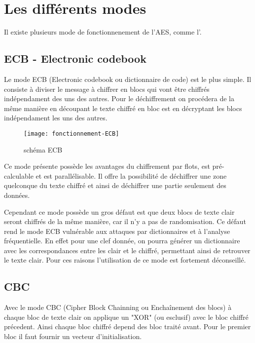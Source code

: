 \chapter{Les différents modes}
\label{chap:différents modes}

Il existe plusieurs mode de fonctionnenement de l'AES, comme l'\aes.

\section{ECB - Electronic codebook}

Le mode ECB (Electronic codebook ou dictionnaire de code) est le plus simple. Il consiste à diviser le message à chiffrer en blocs qui vont être chiffrés indépendament des uns des autres. Pour le déchiffrement on procédera de la même manière en découpant le texte chiffré en bloc est en décryptant les blocs indépendament les uns des autres.

\begin{figure}[!h]
  \centering
  \texttt{[image: fonctionnement-ECB]}
  \caption{schéma ECB \cite{wiki}}
  \label{schema ECB}
\end{figure}

Ce mode présente possède les avantages du chiffrement par flots, est pré-calculable et est parallélisable. Il offre la possibilité de déchiffrer une zone quelconque du texte chiffré et ainsi de déchiffrer une partie seulement des données.

Cependant ce mode possède un gros défaut est que deux blocs de texte clair seront chiffrés de la même manière, car il n'y a pas de randomisation. Ce défaut rend le mode ECB vulnérable aux attaques par dictionnaires et à l'analyse fréquentielle. En effet pour une clef donnée, on pourra générer un dictionnaire avec les correspondances entre les clair et le chiffré, permettant ainsi de retrouver le texte clair. Pour ces raisons l'utilisation de ce mode est fortement déconseillé.

\section{CBC}

Avec le mode CBC (Cipher Block Chainning ou Enchaînement des blocs) à chaque bloc de texte clair on applique un "XOR" (ou esclusif) avec le bloc chiffré précedent. Ainsi chaque bloc chiffré depend des bloc traité avant. Pour le premier bloc il faut fournir un vecteur d'initialisation.

